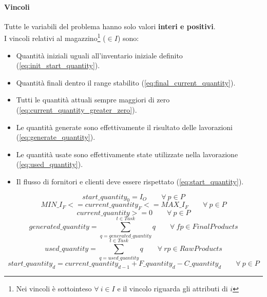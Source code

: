 \paragraph{Vincoli}
Tutte le variabili del problema hanno solo valori \textbf{interi e positivi}.\\
I vincoli relativi al magazzino\footnote{Nei vincoli è sottointeso \(\forall\ i \in I\) e il vincolo riguarda gli attributi di \(i\)} (\(\in I\)) sono:
\begin{itemize}
    \item Quantità iniziali uguali all'inventario iniziale definito (\ref{eq:init_start_quantity}).
    \item Quantità finali dentro il range stabilito (\ref{eq:final_current_quantity}).
    \item Tutti le quantità attuali sempre maggiori di zero (\ref{eq:current_quantity_greater_zero}).
    \item Le quantità generate sono effettivamente il risultato delle lavorazioni (\ref{eq:generate_quantity}).
    \item Le quantità usate sono effettivamente state utilizzate nella lavorazione (\ref{eq:used_quantity}).
    \item Il flusso di fornitori e clienti deve essere rispettato (\ref{eq:start_quantity}).
\end{itemize}
\begin{equation} \label{eq:init_start_quantity}
    start\_quantity_0 = I_O \qquad  \forall\ p \in P
\end{equation}
\begin{equation} \label{eq:final_current_quantity}
    MIN\_I_F <= current\_quantity_F <= MAX\_I_F \qquad  \forall\ p \in P
\end{equation}
\begin{equation} \label{eq:current_quantity_greater_zero}
    current\_quantity >= 0 \qquad \forall\ p \in P
\end{equation}
\begin{equation} \label{eq:generate_quantity}
    generated\_quantity = \sum_{q=generated\_quantity}^{t \in Task}q \qquad  \forall\ fp \in FinalProducts
\end{equation}
\begin{equation} \label{eq:used_quantity}
    used\_quantity = \sum_{q = used\_quantity}^{t \in Task}q \qquad \forall\ rp \in RawProducts
\end{equation}
\begin{equation} \label{eq:start_quantity}
    start\_quantity_{d} = current\_quantity_{d-1} + F\_quantity_{d} - C\_quantity_{d}  \qquad  \forall\ p \in P
\end{equation}
